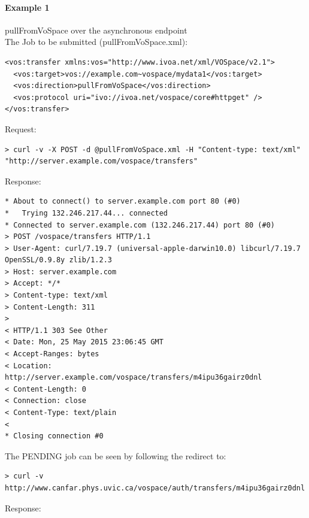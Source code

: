\documentclass[11pt,a4paper]{ivoa}
\begin{document}
\paragraph{Example 1}
pullFromVoSpace over the asynchronous endpoint
\\[5px]
\noindent
The Job to be submitted (pullFromVoSpace.xml):
\begin{lstlisting}
<vos:transfer xmlns:vos="http://www.ivoa.net/xml/VOSpace/v2.1">
  <vos:target>vos://example.com~vospace/mydata1</vos:target>
  <vos:direction>pullFromVoSpace</vos:direction>
  <vos:protocol uri="ivo://ivoa.net/vospace/core#httpget" />
</vos:transfer>
\end{lstlisting}
Request:
\begin{lstlisting}
> curl -v -X POST -d @pullFromVoSpace.xml -H "Content-type: text/xml" "http://server.example.com/vospace/transfers"
\end{lstlisting}
Response:
\begin{lstlisting}
* About to connect() to server.example.com port 80 (#0)
*   Trying 132.246.217.44... connected
* Connected to server.example.com (132.246.217.44) port 80 (#0)
> POST /vospace/transfers HTTP/1.1
> User-Agent: curl/7.19.7 (universal-apple-darwin10.0) libcurl/7.19.7 OpenSSL/0.9.8y zlib/1.2.3
> Host: server.example.com
> Accept: */*
> Content-type: text/xml
> Content-Length: 311
>
< HTTP/1.1 303 See Other
< Date: Mon, 25 May 2015 23:06:45 GMT
< Accept-Ranges: bytes
< Location: http://server.example.com/vospace/transfers/m4ipu36gairz0dnl
< Content-Length: 0
< Connection: close
< Content-Type: text/plain
<
* Closing connection #0
\end{lstlisting}
The PENDING job can be seen by following the redirect to:
\begin{lstlisting}
> curl -v http://www.canfar.phys.uvic.ca/vospace/auth/transfers/m4ipu36gairz0dnl
\end{lstlisting}
Response:
\end{document}
